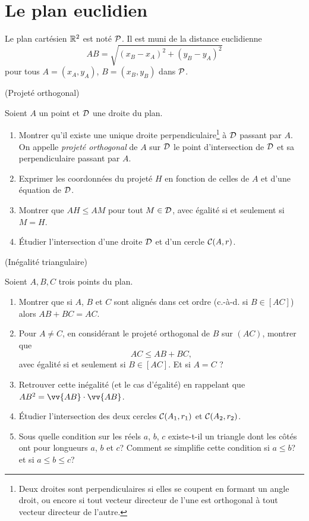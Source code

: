 \documentclass[a4paper,11pt,reqno]{amsart}
\begin{document}

\section{Le plan euclidien}

\begin{convention}
  Le plan cartésien $\mathbb{R}^2$ est noté $\mathcal{P}$. Il est muni de la distance euclidienne
  \[
    AB=\sqrt{(x_B-x_A)^2+(y_B-y_A)^2}
  \]
  pour tous $A=(x_A,y_A)$, $B=(x_B,y_B)$ dans $\mathcal{P}$.
\end{convention}


\begin{exo} (Projeté orthogonal)

  Soient $A$ un point et $\mathcal{D}$ une droite du plan.
  \begin{enumerate}
     \item Montrer qu'il existe une unique droite perpendiculaire\footnote{Deux droites sont perpendiculaires si elles se coupent en formant un angle droit, ou encore si tout vecteur directeur de l'une est orthogonal à tout vecteur directeur de l'autre.} à $\mathcal{D}$ passant par $A$. On appelle \emph{projeté orthogonal} de $A$ sur $\mathcal{D}$ le point d'intersection de $\mathcal{D}$ et sa perpendiculaire passant par $A$.
     \item Exprimer les coordonnées du projeté $H$ en fonction de celles de $A$ et d'une équation de $\mathcal{D}$.
     \item Montrer que $AH\leqslant AM$ pour tout $M \in \mathcal{D}$, avec égalité si et seulement si $M=H$.
     \item Étudier l'intersection d'une droite $\mathcal{D}$ et d'un cercle $\mathcal{C}(A,r)$.
  \end{enumerate}
\end{exo}


\begin{exo} (Inégalité triangulaire)

  Soient $A,B,C$ trois points du plan.
  \begin{enumerate}
    \item Montrer que si $A$, $B$ et $C$ sont alignés dans cet ordre (c.-à-d. si $B \in [AC]$) alors $AB+BC=AC$.
    \item Pour $A \neq C$, en considérant le projeté orthogonal de $B$ sur $(AC)$, montrer que
    \[
      AC \leqslant AB+BC,
    \]
    avec égalité si et seulement si $B \in [AC]$. Et si $A=C$ ?
    \item Retrouver cette inégalité (et le cas d'égalité) en rappelant que $AB^{2}=\vv{AB}\cdot\vv{AB}$.
    \item Étudier l'intersection des deux cercles $\mathcal{C}(A_1,r_1)$ et $\mathcal{C}(A_2,r_2)$.
    \item Sous quelle condition sur les réels $a$, $b$, $c$ existe-t-il un triangle dont les côtés ont pour longueurs $a$, $b$ et $c$? Comment se simplifie cette condition si $a \leqslant b$? et si $a \leqslant b \leqslant c$?
  \end{enumerate}
\end{exo}
\end{document}
